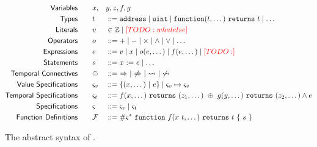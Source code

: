 \begin{figure}
  \begin{alignat*}{3}
    \mathsf{Variables}  \qquad & x,&&y,z,f,g \\
    \mathsf{Types}      \qquad & t && ::=
      \texttt{address} \mid
      \texttt{uint} \mid
      \texttt{function}(t, \dots)~\texttt{returns}~t \mid
      \dots \\
    \mathsf{Literals}    \qquad & v && \in
      \mathbb{Z} \mid
      {\color{red}[TODO: whatelse]} \\
    \mathsf{Operators} \qquad & o && ::=
      + \mid
      - \mid
      \times \mid
      \land \mid
      \lor \mid
      \dots \\
    \mathsf{Expressions}\qquad & e && ::=
      v \mid
      x \mid
      o(e, \dots) \mid
      f(e, \dots) \mid
      {\color{red}[TODO: ]} \\
    \mathsf{Statements} \qquad & s && ::=
      x ~\mathsf{:=}~ e \mid
      \dots \\
    \mathsf{Temporal~Connectives} \qquad & \oplus && ::=
      ~ \Rightarrow ~\mid~ \not\Rightarrow ~\mid~ \leadsto ~\mid~ \not\leadsto \\
    \mathsf{Value~Specifications} \qquad & \varsigma_v && ::=
      \{ (x, \dots) ~\vert~ e \} \mid
      \varsigma_v \mapsto \varsigma_v \\
    \mathsf{Temporal~Specifications} \qquad & \varsigma_t && ::=
     f(x, \dots)~\texttt{returns}~ (z_1, \dots) ~\oplus~ g(y, \dots)~\texttt{returns}~ (z_2, \dots) \land e \\
    \mathsf{Specifications} \qquad & \varsigma && ::= \varsigma_v \mid \varsigma_t \\
    \mathsf{Function~Definitions} \qquad & \mathcal{F} && ::=
      \# \varsigma^* ~ \texttt{function}~f(x ~ t, \dots)~\texttt{returns}~t~\{ ~s~ \}
  \end{alignat*}
  \caption{The abstract syntax of \lang.}
  \label{fig:syntax}
\end{figure}
